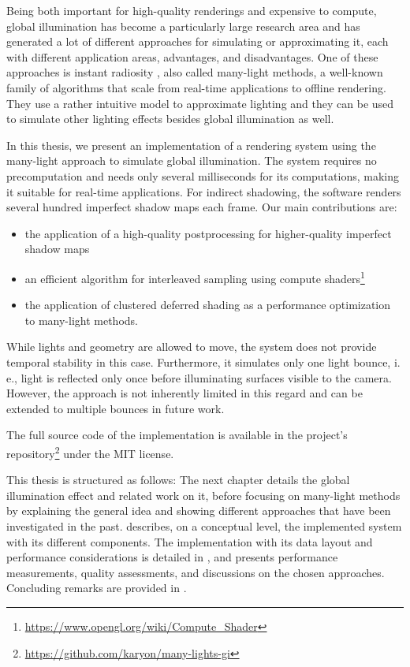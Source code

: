 Being both important for high-quality renderings and expensive to compute, global illumination has become a particularly large research area and has generated a lot of different approaches for simulating or approximating it, each with different application areas, advantages, and disadvantages. One of these approaches is instant radiosity \citep{Keller:1997:InstantRadiosity}, also called many-light methods, a well-known family of algorithms that scale from real-time applications to offline rendering. They use a rather intuitive model to approximate lighting and they can be used to simulate other lighting effects besides global illumination as well.

In this thesis, we present an implementation of a rendering system using the many-light approach to simulate global illumination. The system requires no precomputation and needs only several milliseconds for its computations, making it suitable for real-time applications. For indirect shadowing, the software renders several hundred imperfect shadow maps \citep{ritschel2008ism} each frame. Our main contributions are:
\begin{itemize}
    \item the application of a high-quality postprocessing \citep{Marroquim:2007:reconstruction} for higher-quality imperfect shadow maps
    \item an efficient algorithm for interleaved sampling \citep{Keller:2001:InterleavedSampling} using compute shaders\footnote{\url{https://www.opengl.org/wiki/Compute_Shader}}
    \item the application of clustered deferred shading \citep{olsson2012clustered} as a performance optimization to many-light methods.
\end{itemize}

\noindent
While lights and geometry are allowed to move, the system does not provide temporal stability in this case. Furthermore, it simulates only one light bounce, i.\,e., light is reflected only once before illuminating surfaces visible to the camera. However, the approach is not inherently limited in this regard and can be extended to multiple bounces in future work.

\vspace{\baselineskip}
\noindent
The full source code of the implementation is available in the project's repository\footnote{\url{https://github.com/karyon/many-lights-gi}} under the MIT license.

\vspace{\baselineskip}
\noindent
This thesis is structured as follows: The next chapter details the global illumination effect and related work on it, before focusing on many-light methods by explaining the general idea and showing different approaches that have been investigated in the past.  describes, on a conceptual level, the implemented system with its different components. The implementation with its data layout and performance considerations is detailed in , and  presents performance measurements, quality assessments, and discussions on the chosen approaches. Concluding remarks are provided in .


\cleardoublepage
